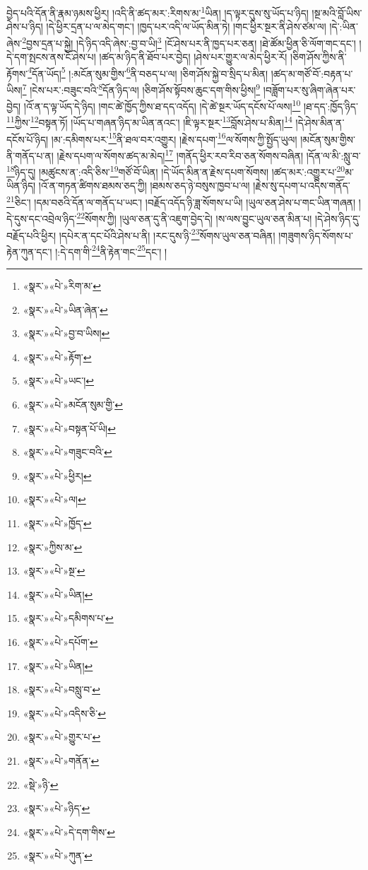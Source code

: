 བྱེད་པའི་དོན་ནི་རྣམ་ཉམས་ཕྱིར། །འདི་ནི་ཚད་མར་:རིགས་མ་\footnote{«སྣར་»«པེ་»རིག་མ་}ཡིན། །ད་ལྟར་དུས་སུ་ཡོད་པ་ཉིད། །སྔ་མའི་བློ་ཡིས་ཤེས་པ་ཉིད། །དེ་ཕྱིར་དྲན་པ་ལ་མེད་གང་། །ཁྱད་པར་འདི་ལ་ཡོད་མིན་ཏེ། །གང་ཕྱིར་སྔར་ནི་ཤེས་ཙམ་ལ། །དེ་:ཡིན་ཞེས་\footnote{«སྣར་»«པེ་»ཡིན་ཞེན་}བྱས་དྲན་པ་སྐྱེ། །དེ་ཉིད་འདི་ཞེས་:བྱ་བ་ཡི།\footnote{«སྣར་»«པེ་»བྱ་བ་ཡིས།} །ངོ་ཤེས་པར་ནི་ཁྱད་པར་ཅན། །ཐེ་ཚོམ་ཕྱིན་ཅི་ལོག་གང་དང་། །དེ་དག་སྤངས་ནས་ངོ་ཤེས་པ། །ཚད་མ་ཉིད་ནི་ཐོབ་པར་བྱེད། །ཤེས་པར་གྱུར་ལ་མེད་ཕྱིར་རོ། །ཅིག་ཤོས་ཀྱིས་ནི་རྟོགས་\footnote{«སྣར་»«པེ་»རྟོག་}དོན་ཡོད།\footnote{«སྣར་»«པེ་»ཡང་།} །:མངོན་སུམ་གྱིས་\footnote{«སྣར་»«པེ་»མངོན་སུམ་གྱི་}ནི་བཅད་པ་ལ། །ཅིག་ཤོས་སྐྱེ་བ་སྲིད་པ་མིན། །ཚད་མ་གཙོ་བོ་:བརྟན་པ་ཡིས།\footnote{«སྣར་»«པེ་»བསྟན་པོ་ཡི།} །ངེས་པར་:བཟུང་བའི་\footnote{«སྣར་»«པེ་»གཟུང་བའི་}དོན་ཉིད་ལ། །ཅིག་ཤོས་སྟོབས་ཆུང་དག་གིས་ཕྱིས།\footnote{«སྣར་»«པེ་»ཕྱིར།} །བཟློག་པར་སུ་ཞིག་ཞེན་པར་བྱེད། །འོ་ན་ད་ལྟ་ཡོད་དེ་ཉིད། །གང་ཚེ་ཁྱོད་ཀྱིས་ཐ་དད་འདོད། །དེ་ཚེ་སྔར་ཡོད་དངོས་པོ་ལས།\footnote{«སྣར་»«པེ་»ལ།} །ཐ་དད་:ཁྱོད་ཉིད་\footnote{«སྣར་»«པེ་»ཁྱོད་}ཀྱིས་\footnote{«སྣར་»ཀྱིས་མ་}བསྟན་ཏོ། །ཡོད་པ་གཞན་ཉིད་མ་ཡིན་ནའང་། །ཇི་ལྟར་སྔར་\footnote{«སྣར་»«པེ་»སྔ་}བློས་ཤེས་པ་མིན།\footnote{«སྣར་»«པེ་»ཡིན།} །དེ་ཤེས་མིན་ན་དངོས་པོ་ཉིད། །མ་:དམིགས་པར་\footnote{«སྣར་»«པེ་»དམིགས་པ་}ནི་ཐལ་བར་འགྱུར། །རྗེས་དཔག་\footnote{«སྣར་»«པེ་»དཔོག་}ལ་སོགས་ཀྱི་སྤྱོད་ཡུལ། །མངོན་སུམ་གྱིས་ནི་གནོད་པ་ན། །རྗེས་དཔག་ལ་སོགས་ཚད་མ་མེད།\footnote{«སྣར་»«པེ་»ཡིན།} །གནོད་ཕྱིར་རབ་རིབ་ཅན་སོགས་བཞིན། །དོན་ལ་མི་:སླུ་བ་\footnote{«སྣར་»«པེ་»བསླུ་བ་}ཉིད་དུ། །མཚུངས་ན་:འདི་ཅིས་\footnote{«སྣར་»«པེ་»འདིས་ཅི་}གཙོ་བོ་ཡིན། །དེ་ཡོད་མིན་ན་རྗེས་དཔག་སོགས། །ཚད་མར་:འགྱུར་པ་\footnote{«སྣར་»«པེ་»གྱུར་པ་}མ་ཡིན་ཉིད། །འོ་ན་གཏན་ཚིགས་ཐམས་ཅད་ཀྱི། །ཐམས་ཅད་ཉེ་བསུས་ཁྱབ་པ་ལ། །རྗེས་སུ་དཔག་པ་འདིས་གནོད་\footnote{«སྣར་»«པེ་»གནོན་}ཅིང་། །དམ་བཅའི་དོན་ལ་གནོད་པ་ཡང་། །བརྗོད་འདོད་ཉི་ཟླ་སོགས་པ་ཡི། །ཡུལ་ཅན་ཤེས་པ་གང་ཡིན་གཞན། །དེ་དུས་དང་འབྲེལ་ཉིད་\footnote{«སྡེ་»ཉི་}སོགས་ཀྱི། །ཡུལ་ཅན་དུ་ནི་འཇུག་བྱེད་དེ། །ས་ལས་བྱུང་ཡུལ་ཅན་མིན་པ། །དེ་ཤེས་ཉིད་དུ་བརྗོད་པའི་ཕྱིར། །དཔེར་ན་དང་པོའི་ཤེས་པ་ནི། །རང་དུས་ཉི་\footnote{«སྣར་»«པེ་»ཉིད་}སོགས་ཡུལ་ཅན་བཞིན། །གཟུགས་ཉིད་སོགས་པ་རྟེན་ཀུན་དང་། །:དེ་དག་གི་\footnote{«སྣར་»«པེ་»དེ་དག་གིས་}ནི་རྟེན་གང་\footnote{«སྣར་»«པེ་»ཀུན་}དང་། །
